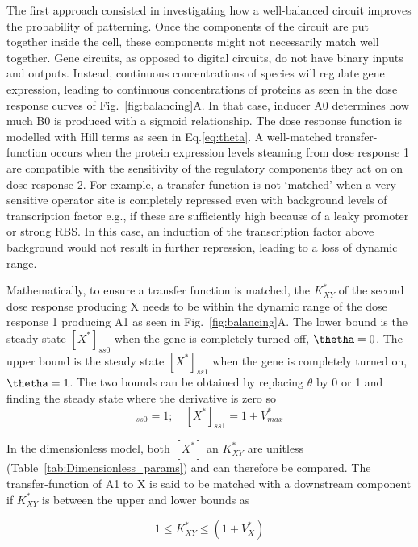 The first approach consisted in investigating how a well-balanced circuit improves the probability of patterning.
Once the components of the circuit are put together inside the cell, these components might not necessarily match well together.
Gene circuits, as opposed to digital circuits, do not have binary inputs and outputs.
Instead, continuous concentrations of species will regulate gene expression, leading to continuous concentrations of proteins as seen in the dose response curves of Fig.~\ref{fig:balancing}A.
In that case, inducer A0 determines how much B0 is produced with a sigmoid relationship.
The dose response function is modelled with Hill terms as seen in Eq.\ref{eq:theta}.
A well-matched transfer-function occurs when the protein expression levels steaming from dose response 1 are compatible with the sensitivity of the regulatory components they act on on dose response 2.
For example, a transfer function is not ‘matched’ when a very sensitive operator site is completely repressed even with background levels of transcription factor e.g., if these are sufficiently high because of a leaky promoter or strong RBS.
In this case, an induction of the transcription factor above background would not result in further repression, leading to a loss of dynamic range.

Mathematically, to ensure a transfer function is matched, the $K^*_{XY}$ of the second dose response producing X needs to be within the dynamic range of the dose response 1 producing A1 as seen in Fig.~\ref{fig:balancing}A.
The lower bound is the steady state $[X^*]_{ss0}$ when the gene is completely turned off, $\thetha=0$.
The upper bound is the steady state $[X^*]_{ss1}$ when the gene is completely turned on, $\thetha=1$.
The two bounds can be obtained by replacing $\theta$ by 0 or 1 and finding the steady state where the derivative is zero so
\begin{equation}
    [X^*]_{ss0}=1; \quad [X^*]_{ss1}=1+V^*_{max}
\end{equation}


In the dimensionless model, both $[X^*]$ an $K^*_{XY}$ are unitless (Table~\ref{tab:Dimensionless_params}) and can therefore be compared.
The transfer-function of A1 to X is said to be matched with a downstream component if $K^*_{XY}$ is between the upper and lower bounds as

\begin{equation}
    1 \leq K^*_{XY} \leq (1+V^*_{X})
\end{equation}

